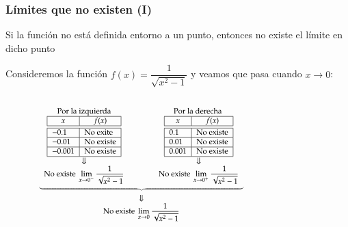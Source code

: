 \begin{frame}
	\frametitle{Límites que no existen (I)}
	Si la función no está definida entorno a un punto, entonces no existe el límite en dicho punto
	
	 Consideremos la función $f(x)=\dfrac{1}{\sqrt{x^2-1}}$ y veamos que pasa cuando $x\rightarrow 0$:
	\begin{columns}
		\begin{column}{0.6\textwidth}
			\[
				\footnotesize
				\begin{array}{c}
					\underbrace{\begin{array}{ccc}
					\textrm{Por la izquierda} & \qquad & \textrm{Por la derecha } \\
					\begin{array}{|l|l|}
					\hline
					\multicolumn{1}{|c|}{x}      & \multicolumn{1}{c|}{f(x)}   \\
					\hline\hline
					-0.1   & \textrm{No exite}      \\
					\hline
					-0.01   & \textrm{No existe}     \\
					\hline
					-0.001  & \textrm{No existe}   \\
					\hline
				\end{array}
				& &
				\begin{array}{|l|l|}
					\hline
					\multicolumn{1}{|c|}{x} & \multicolumn{1}{c|}{f(x)} \\
					\hline\hline
					0.1                     & \textrm{No existe}        \\
					\hline
					0.01                    & \textrm{No existe}        \\
					\hline
					0.001                   & \textrm{No existe}        \\
					\hline
				\end{array}\\
				\Downarrow & & \Downarrow\\
				\displaystyle \textrm{No existe } \lim_{x\rightarrow 0^-}\frac{1}{\sqrt{x^2-1}}
				& &
				\displaystyle \textrm{No existe } \lim_{x\rightarrow 0^+}\frac{1}{\sqrt{x^2-1}}
				\end{array}}\\
				\Downarrow\\
				\displaystyle \textrm{No existe }\lim_{x\rightarrow 0}\frac{1}{\sqrt{x^2-1}}
				\end{array}
			\]
		\end{column}
		\begin{column}{0.4\textwidth}
			\begin{center}
				\scalebox{1}{}
			\end{center}
		\end{column}
	\end{columns}
\end{frame}


